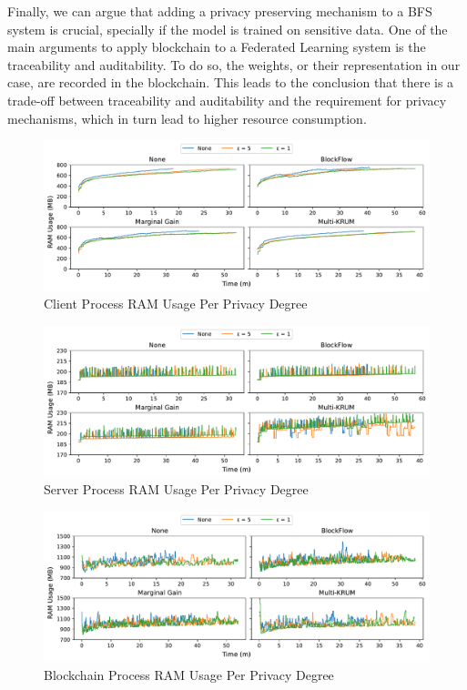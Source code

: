 Finally, we can argue that adding a privacy preserving mechanism to a BFS system is crucial, specially if the model is trained on sensitive data. One of the main arguments to apply blockchain to a Federated Learning system is the traceability and auditability. To do so, the weights, or their representation in our case, are recorded in the blockchain. This leads to the conclusion that there is a trade-off between traceability and auditability and the requirement for privacy mechanisms, which in turn lead to higher resource consumption.

\clearpage

\begin{figure}[!h]
    \centering
    \includegraphics[width=\textwidth]{graphics/privacy/ram_client.pdf}
    \caption{Client Process RAM Usage Per Privacy Degree}
    \label{fig:ram_privacy_clients}
\end{figure}

\vfill

\begin{figure}[!h]
    \centering
    \includegraphics[width=\textwidth]{graphics/privacy/ram_server.pdf}
    \caption{Server Process RAM Usage Per Privacy Degree}
    \label{fig:ram_privacy_servers}
\end{figure}

\vfill

\begin{figure}[!h]
    \centering
    \includegraphics[width=\textwidth]{graphics/privacy/ram_miner.pdf}
    \caption{Blockchain Process RAM Usage Per Privacy Degree}
    \label{fig:ram_privacy_miners}
\end{figure}

